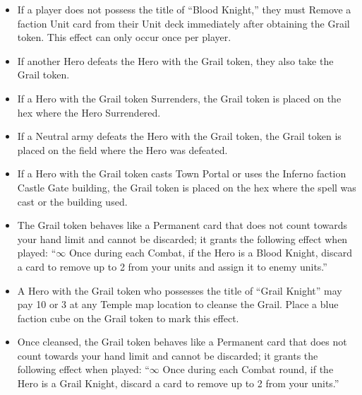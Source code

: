 \begin{multicols*}{2}
\begin{itemize}
  \item If a player does not possess the title of ``\textcolor{darkcandyapplered}{Blood Knight},'' they must Remove a faction Unit card from their Unit deck immediately after obtaining the Grail token. This effect can only occur once per player.
  \item If another Hero defeats the Hero with the Grail token, they also take the Grail token.
  \item If a Hero with the Grail token Surrenders, the Grail token is placed on the hex where the Hero Surrendered.
  \item If a Neutral army defeats the Hero with the Grail token, the Grail token is placed on the field where the Hero was defeated.
  \item If a Hero with the Grail token casts Town Portal or uses the Inferno faction Castle Gate building, the Grail token is placed on the hex where the spell was cast or the building used.
  \item The Grail token behaves like a Permanent card that does not count towards your hand limit and cannot be discarded; it grants the following effect when played: ``$\infty$ Once during each Combat, if the Hero is a \textcolor{darkcandyapplered}{Blood Knight}, discard a card to remove up to 2  from your units and assign it to enemy units.''
  \item A Hero with the Grail token who possesses the title of ``\textcolor{darkcerulean}{Grail Knight}'' may pay 10  or 3  at any Temple map location to cleanse the Grail. Place a blue faction cube on the Grail token to mark this effect.
  \item Once cleansed, the Grail token behaves like a Permanent card that does not count towards your hand limit and cannot be discarded; it grants the following effect when played: ``$\infty$ Once during each Combat round, if the Hero is a \textcolor{darkcerulean}{Grail Knight}, discard a card to remove up to 2  from your units.''
\end{itemize}

\end{multicols*}

